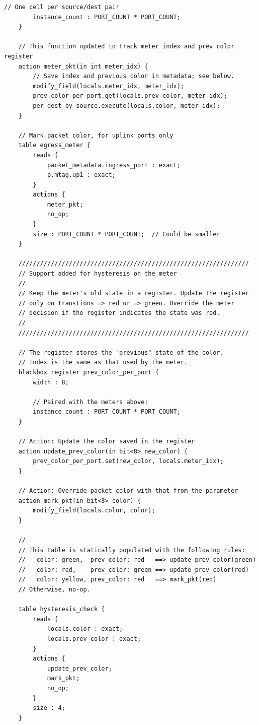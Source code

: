 \documentclass[12pt]{article}
\begin{document}
\begin{lstlisting}[style=P4style]
        // One cell per source/dest pair
        instance_count : PORT_COUNT * PORT_COUNT;
    }

    // This function updated to track meter index and prev color register
    action meter_pkt(in int meter_idx) {
        // Save index and previous color in metadata; see below.
        modify_field(locals.meter_idx, meter_idx);
        prev_color_per_port.get(locals.prev_color, meter_idx);
        per_dest_by_source.execute(locals.color, meter_idx);
    }

    // Mark packet color, for uplink ports only
    table egress_meter {
        reads {
            packet_metadata.ingress_port : exact;
            p.mtag.up1 : exact;
        }
        actions {
            meter_pkt;
            no_op;
        }
        size : PORT_COUNT * PORT_COUNT;  // Could be smaller
    }

    ////////////////////////////////////////////////////////////////
    // Support added for hysteresis on the meter
    //
    // Keep the meter's old state in a register. Update the register
    // only on transtions => red or => green. Override the meter 
    // decision if the register indicates the state was red.
    //
    ////////////////////////////////////////////////////////////////

    // The register stores the "previous" state of the color.
    // Index is the same as that used by the meter.
    blackbox register prev_color_per_port {
        width : 8;

        // Paired with the meters above:
        instance_count : PORT_COUNT * PORT_COUNT;
    }

    // Action: Update the color saved in the register
    action update_prev_color(in bit<8> new_color) {
        prev_color_per_port.set(new_color, locals.meter_idx);
    }

    // Action: Override packet color with that from the parameter
    action mark_pkt(in bit<8> color) {
        modify_field(locals.color, color);
    }

    //
    // This table is statically populated with the following rules:
    //   color: green,  prev_color: red   ==> update_prev_color(green)
    //   color: red,    prev_color: green ==> update_prev_color(red)
    //   color: yellow, prev_color: red   ==> mark_pkt(red)
    // Otherwise, no-op.

    table hysteresis_check {
        reads {
            locals.color : exact;
            locals.prev_color : exact;
        }
        actions {
            update_prev_color;
            mark_pkt;
            no_op;
        }
        size : 4;
    }


\end{lstlisting}
\end{document}
